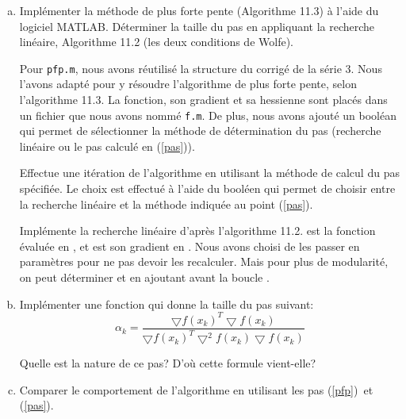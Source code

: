 \documentclass[11pt,a4paper,twoside,onecolumn,titlepage]{report}
\begin{document}
\begin{enumerate}[(a)]
\item\label{pfp} Implémenter la méthode de plus forte pente (Algorithme 11.3) à l'aide du logiciel MATLAB. Déterminer la taille du pas en appliquant la recherche linéaire, Algorithme 11.2 (les deux conditions de Wolfe).

%
%

Pour \texttt{pfp.m}, nous avons réutilisé la structure du corrigé de la série 3. Nous l'avons adapté pour y résoudre l'algorithme de plus forte pente, selon l'algorithme 11.3. La fonction, son gradient et sa hessienne sont placés dans un fichier que nous avons nommé \texttt{f.m}. De plus, nous avons ajouté un booléan  qui permet de sélectionner la méthode de détermination du pas (recherche linéaire ou le pas calculé en (\ref{pas})).



Effectue une itération de l'algorithme en utilisant la méthode de calcul du pas spécifiée. Le choix est effectué à l'aide du booléen  qui permet de choisir entre la recherche linéaire et la méthode indiquée au point (\ref{pas}).



Implémente la recherche linéaire d'après l'algorithme 11.2.  est la fonction évaluée en , et  est son gradient en . Nous avons choisi de les passer en paramètres pour ne pas devoir les recalculer. Mais pour plus de modularité, on peut déterminer  et  en ajoutant  avant la boucle .


\item\label{pas} Implémenter une fonction qui donne la taille du pas suivant:
\begin{equation}
\alpha_k = \frac{\bigtriangledown f(x_k)^T \bigtriangledown f(x_k)}{\bigtriangledown f(x_k)^T \bigtriangledown^2 f(x_k) \bigtriangledown f(x_k)}
\end{equation}

Quelle est la nature de ce pas? D'où cette formule vient-elle?

%
%

\item Comparer le comportement de l'algorithme en utilisant les pas (\ref{pfp})\ et (\ref{pas}).

%
%


\end{enumerate}
\end{document}
